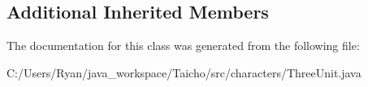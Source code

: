 \subsection*{Additional Inherited Members}


The documentation for this class was generated from the following file\-:\begin{DoxyCompactItemize}
\item 
C\-:/\-Users/\-Ryan/java\-\_\-workspace/\-Taicho/src/characters/Three\-Unit.\-java\end{DoxyCompactItemize}
